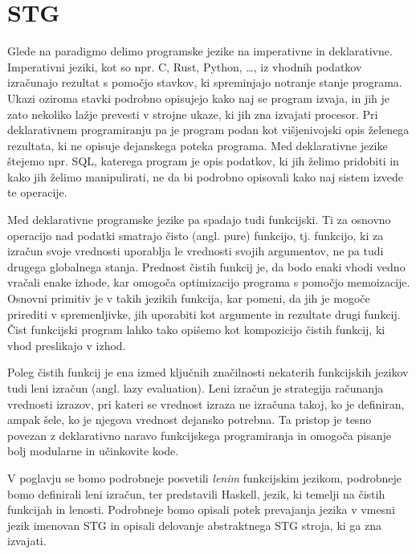 \chapter{STG}
\label{ch:stg}

Glede na paradigmo delimo programske jezike na imperativne in deklarativne. Imperativni jeziki, kot so npr. C, Rust, Python, \dots, iz vhodnih podatkov izračunajo rezultat s pomočjo stavkov, ki spreminjajo notranje stanje programa. Ukazi oziroma stavki podrobno opisujejo kako naj se program izvaja, in jih je zato nekoliko lažje prevesti v strojne ukaze, ki jih zna izvajati procesor. Pri deklarativnem programiranju pa je program podan kot višjenivojski opis želenega rezultata, ki ne opisuje dejanskega poteka programa. Med deklarativne jezike štejemo npr. SQL, katerega program je opis podatkov, ki jih želimo pridobiti in kako jih želimo manipulirati, ne da bi podrobno opisovali kako naj sistem izvede te operacije.

Med deklarativne programske jezike pa spadajo tudi funkcijski. Ti za osnovno operacijo nad podatki smatrajo čisto (angl. pure) funkcijo, tj. funkcijo, ki za izračun svoje vrednosti uporablja le vrednosti svojih argumentov, ne pa tudi drugega globalnega stanja. Prednost čistih funkcij je, da bodo enaki vhodi vedno vračali enake izhode, kar omogoča optimizacijo programa s pomočjo memoizacije. Osnovni primitiv je v takih jezikih funkcija, kar pomeni, da jih je mogoče prirediti v spremenljivke, jih uporabiti kot argumente in rezultate drugi funkcij. Čist funkcijski program lahko tako opišemo kot kompozicijo čistih funkcij, ki vhod preslikajo v izhod.

Poleg čistih funkcij je ena izmed ključnih značilnosti nekaterih funkcijskih jezikov tudi leni izračun (angl. lazy evaluation). Leni izračun je strategija računanja vrednosti izrazov, pri kateri se vrednost izraza ne izračuna takoj, ko je definiran, ampak šele, ko je njegova vrednost dejansko potrebna. Ta pristop je tesno povezan z deklarativno naravo funkcijskega programiranja in omogoča pisanje bolj modularne in učinkovite kode.

V poglavju se bomo podrobneje posvetili \textit{lenim} funkcijskim jezikom, podrobneje bomo definirali leni izračun, ter predstavili Haskell, jezik, ki temelji na čistih funkcijah in lenosti. Podrobneje bomo opisali potek prevajanja jezika v vmesni jezik imenovan STG in opisali delovanje abstraktnega STG stroja, ki ga zna izvajati.

